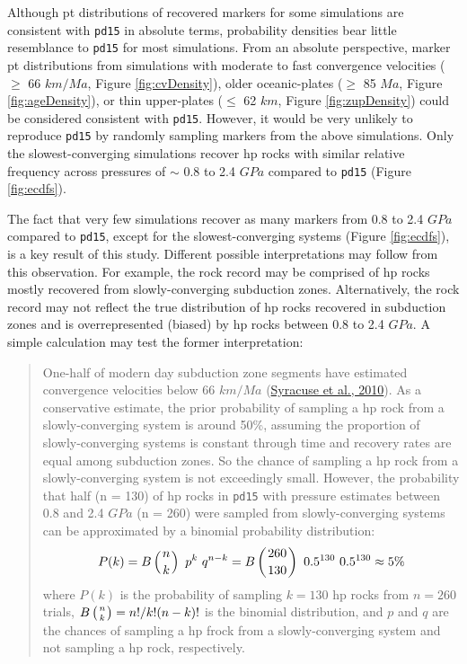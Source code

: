 Although \gls{pt} distributions of recovered markers for some simulations are consistent with \texttt{pd15} in absolute terms, probability densities bear little resemblance to \texttt{pd15} for most simulations. From an absolute perspective, marker \gls{pt} distributions from simulations with moderate to fast convergence velocities (\(\geq\) 66 \(km/Ma\), Figure \ref{fig:cvDensity}), older oceanic-plates (\(\geq\) 85 \(Ma\), Figure \ref{fig:ageDensity}), or thin upper-plates (\(\leq\) 62 \(km\), Figure \ref{fig:zupDensity}) could be considered consistent with \texttt{pd15}. However, it would be very unlikely to reproduce \texttt{pd15} by randomly sampling markers from the above simulations. Only the slowest-converging simulations recover \gls{hp} rocks with similar relative frequency across pressures of \(\sim\) 0.8 to 2.4 \(GPa\) compared to \texttt{pd15} (Figure \ref{fig:ecdfs}).

The fact that very few simulations recover as many markers from 0.8 to 2.4 \(GPa\) compared to \texttt{pd15}, except for the slowest-converging systems (Figure \ref{fig:ecdfs}), is a key result of this study. Different possible interpretations may follow from this observation. For example, the rock record may be comprised of \gls{hp} rocks mostly recovered from slowly-converging subduction zones. Alternatively, the rock record may not reflect the true distribution of \gls{hp} rocks recovered in subduction zones and is overrepresented (biased) by \gls{hp} rocks between 0.8 to 2.4 \(GPa\). A simple calculation may test the former interpretation:

\begin{quote}
One-half of modern day subduction zone segments have estimated convergence velocities below 66 \(km/Ma\) (\protect\hyperlink{ref-syracuse2010}{Syracuse et al., 2010}). As a conservative estimate, the prior probability of sampling a \gls{hp} rock from a slowly-converging system is around 50\%, assuming the proportion of slowly-converging systems is constant through time and recovery rates are equal among subduction zones. So the chance of sampling a \gls{hp} rock from a slowly-converging system is not exceedingly small. However, the probability that half (n = 130) of \gls{hp} rocks in \texttt{pd15} with pressure estimates between 0.8 and 2.4 \(GPa\) (n = 260) were sampled from slowly-converging systems can be approximated by a binomial probability distribution:
\begin{equation}P(k) = B\left(n \atop k \right)\ p^k\ q^{n-k} = B\left(260 \atop 130 \right)\ 0.5^{130}\ 0.5^{130} \approx 5\% \label{eq:binom} \end{equation}
where \(P(k)\) is the probability of sampling \(k=130\) \gls{hp} rocks from \(n=260\) trials, \(B\left( n \atop k \right) = n!/k!(n-k)!\) is the binomial distribution, and \(p\) and \(q\) are the chances of sampling a \gls{hp} frock from a slowly-converging system and not sampling a \gls{hp} rock, respectively.
\end{quote}

